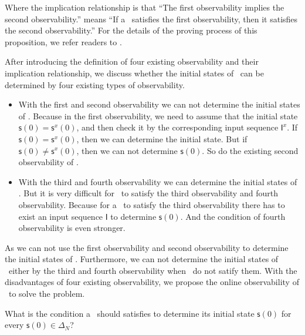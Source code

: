 Where the implication relationship is that ``The first observability implies the second observability.'' means ``If a \BCN\ satisfies the first observability, then it satisfies the second observability.'' For the details of the proving process of this proposition, we refer readers to \cite{Zhang2016Observability}.
   
After introducing the definition of four existing observability and their implication relationship, we discuss whether the initial states of \BCNs\ can be determined by four existing types of observability. 
\begin{itemize}
\item With the first and second observability we can not determine the initial states of \BCNs. Because in the first observability, we need to assume that the initial state $\mathsf{s}(0)=\mathsf{s}^{x}(0)$, and then check it by the corresponding input sequence $\mathsf{I}^x$. If $\mathsf{s}(0)=\mathsf{s}^{x}(0)$, then we can determine the initial state. But if $\mathsf{s}(0)\ne \mathsf{s}^{x}(0)$, then we can not determine $\mathsf{s}(0)$. %
So do the existing second observability of \BCNs. 

\item With the third and fourth observability we can determine the initial states of \BCNs. But it is very difficult for \BCNs\ to satisfy the third observability and fourth observability. Because for a \BCN\ to satisfy the third observability there has to exist an input sequence $\mathsf{I}$ to determine $\mathsf{s}(0)$. And the condition of fourth observability is even stronger.%
\end{itemize} 
 
As we can not use the first observability and second observability to determine the initial states of \BCNs. Furthermore, we can not determine the initial states of \BCNs\ either by the third and fourth observability when \BCNs\ do not satify them. With the disadvantages of four existing observability, we propose the online observability of \BCNs\ to solve the problem.

 \begin{problem}
\label{pro:2}
What is the condition a \BCN\ should satisfies to determine its initial state $\mathsf{s}(0)$ for every $\mathsf{s}(0)\in\Delta_N$?
\end{problem}